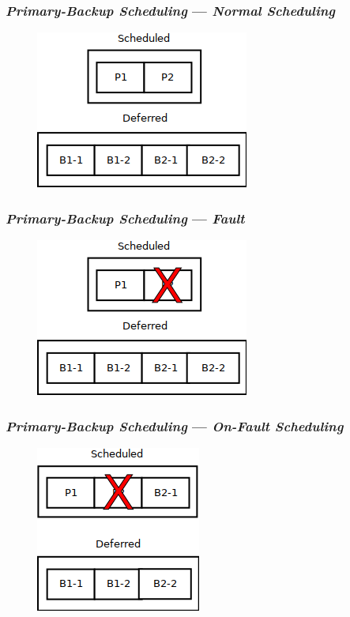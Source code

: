 \documentclass[xetex]{beamer}
\begin{document}
    \begin{frame}
        \frametitle{\textit{Primary-Backup Scheduling} --- \textit{Normal Scheduling}}
        \begin{figure}[htbp]
            \includegraphics[scale=0.7]{resources/schedule_normal.png}
        \end{figure}
    \end{frame}
    \begin{frame}
        \frametitle{\textit{Primary-Backup Scheduling} --- \textit{Fault}}
        \begin{figure}[htbp]
            \includegraphics[scale=0.7]{resources/fault.png}
        \end{figure}
    \end{frame}
    \begin{frame}
        \frametitle{\textit{Primary-Backup Scheduling} --- \textit{On-Fault Scheduling}}
        \begin{figure}[htbp]
            \includegraphics[scale=0.7]{resources/schedule_onfault.png}
        \end{figure}
    \end{frame}
\end{document}
